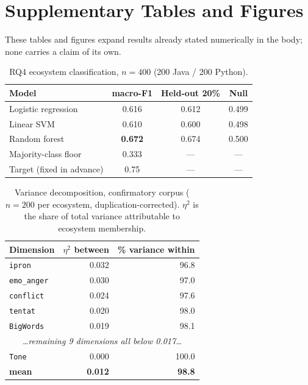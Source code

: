 \documentclass[conference]{IEEEtran}
\begin{document}
\section{Supplementary Tables and Figures}
\label{annex:figures}

These tables and figures expand results already stated numerically in
the body; none carries a claim of its own.

\begin{table}[htbp]
\caption{RQ4 ecosystem classification, $n=400$ (200 Java / 200 Python).}
\label{tbl:rq4}
\begin{center}
\begin{tabular}{lccc}
\toprule
\textbf{Model} & \textbf{macro-F1} & \textbf{Held-out 20\%} & \textbf{Null} \\
\midrule
Logistic regression & 0.616 & 0.612 & 0.499 \\
Linear SVM          & 0.610 & 0.600 & 0.498 \\
Random forest       & \textbf{0.672} & 0.674 & 0.500 \\
\midrule
Majority-class floor & 0.333 & --- & --- \\
Target (fixed in advance) & 0.75 & --- & --- \\
\bottomrule
\end{tabular}
\end{center}
\end{table}

\begin{table}[htbp]
\caption{Variance decomposition, confirmatory corpus ($n=200$ per ecosystem,
duplication-corrected). $\eta^2$ is the share of total variance attributable to
ecosystem membership.}
\label{tbl:rq2var}
\begin{center}
\begin{tabular}{lrr}
\toprule
\textbf{Dimension} & \textbf{$\eta^2$ between} & \textbf{\% variance within} \\
\midrule
\texttt{ipron}     & 0.032 & 96.8 \\
\texttt{emo\_anger}& 0.030 & 97.0 \\
\texttt{conflict}  & 0.024 & 97.6 \\
\texttt{tentat}    & 0.020 & 98.0 \\
\texttt{BigWords}  & 0.019 & 98.1 \\
\multicolumn{3}{c}{\emph{\ldots remaining 9 dimensions all below 0.017\ldots}} \\
\texttt{Tone}      & 0.000 & 100.0 \\
\midrule
\textbf{mean}      & \textbf{0.012} & \textbf{98.8} \\
\bottomrule
\end{tabular}
\end{center}
\end{table}
\end{document}
